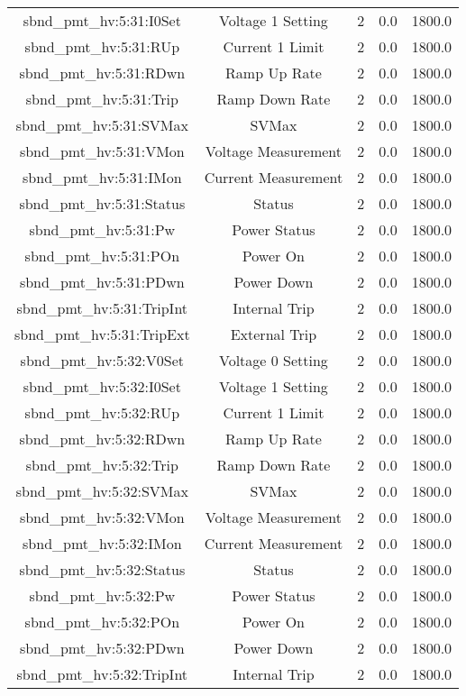 \begin{table}[ptb]
\begin{tabular}{c | c c c c}
sbnd_pmt_hv:5:31:I0Set & Voltage 1 Setting & 2 & 0.0 & 1800.0\\ 
sbnd_pmt_hv:5:31:RUp & Current 1 Limit & 2 & 0.0 & 1800.0\\ 
sbnd_pmt_hv:5:31:RDwn & Ramp Up Rate & 2 & 0.0 & 1800.0\\ 
sbnd_pmt_hv:5:31:Trip & Ramp Down Rate & 2 & 0.0 & 1800.0\\ 
sbnd_pmt_hv:5:31:SVMax & SVMax & 2 & 0.0 & 1800.0\\ 
sbnd_pmt_hv:5:31:VMon & Voltage Measurement & 2 & 0.0 & 1800.0\\ 
sbnd_pmt_hv:5:31:IMon & Current Measurement & 2 & 0.0 & 1800.0\\ 
sbnd_pmt_hv:5:31:Status & Status & 2 & 0.0 & 1800.0\\ 
sbnd_pmt_hv:5:31:Pw & Power Status & 2 & 0.0 & 1800.0\\ 
sbnd_pmt_hv:5:31:POn & Power On & 2 & 0.0 & 1800.0\\ 
sbnd_pmt_hv:5:31:PDwn & Power Down & 2 & 0.0 & 1800.0\\ 
sbnd_pmt_hv:5:31:TripInt & Internal Trip & 2 & 0.0 & 1800.0\\ 
sbnd_pmt_hv:5:31:TripExt & External Trip & 2 & 0.0 & 1800.0\\ 
sbnd_pmt_hv:5:32:V0Set & Voltage 0 Setting & 2 & 0.0 & 1800.0\\ 
sbnd_pmt_hv:5:32:I0Set & Voltage 1 Setting & 2 & 0.0 & 1800.0\\ 
sbnd_pmt_hv:5:32:RUp & Current 1 Limit & 2 & 0.0 & 1800.0\\ 
sbnd_pmt_hv:5:32:RDwn & Ramp Up Rate & 2 & 0.0 & 1800.0\\ 
sbnd_pmt_hv:5:32:Trip & Ramp Down Rate & 2 & 0.0 & 1800.0\\ 
sbnd_pmt_hv:5:32:SVMax & SVMax & 2 & 0.0 & 1800.0\\ 
sbnd_pmt_hv:5:32:VMon & Voltage Measurement & 2 & 0.0 & 1800.0\\ 
sbnd_pmt_hv:5:32:IMon & Current Measurement & 2 & 0.0 & 1800.0\\ 
sbnd_pmt_hv:5:32:Status & Status & 2 & 0.0 & 1800.0\\ 
sbnd_pmt_hv:5:32:Pw & Power Status & 2 & 0.0 & 1800.0\\ 
sbnd_pmt_hv:5:32:POn & Power On & 2 & 0.0 & 1800.0\\ 
sbnd_pmt_hv:5:32:PDwn & Power Down & 2 & 0.0 & 1800.0\\ 
sbnd_pmt_hv:5:32:TripInt & Internal Trip & 2 & 0.0 & 1800.0\\ 

\end{tabular}
\end{table}
